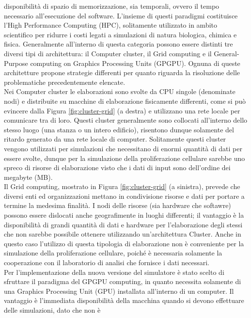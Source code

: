 disponibilità di spazio di memorizzazione, sia temporali, ovvero il tempo 
necessario all'esecuzione del software. L'insieme di questi paradigmi 
costituisce l'High Performance Computing (HPC), solitamente utilizzato in 
ambito scientifico per ridurre i costi legati a simulazioni di natura 
biologica, chimica e fisica.
Generalmente all'interno di questa categoria possono essere distinti tre 
diversi tipi di architettura: il Computer cluster, il Grid computing e 
il General-Purpose computing on Graphics Processing Units (GPGPU).
Ognuna di queste architetture propone strategie differenti per quanto riguarda 
la risoluzione delle problematiche precedentemente elencate.
\\
Nei Computer cluster le elaborazioni sono svolte da CPU singole
(denominate nodi) e distribuite su macchine di elaborazione fisicamente 
differenti, come si può evincere dalla Figura \ref{fig:cluster-grid} (a destra) 
e utilizzano una rete locale per comunicare tra di loro. Questi cluster
generalmente sono collocati all'interno dello stesso luogo
(una stanza o un intero edificio), risentono dunque solamente del ritardo generato
da una rete locale di computer. Solitamente questi cluster vengono utilizzati 
per simulazioni che necessitano di enormi quantità di dati per essere svolte, 
dunque per la simulazione della proliferazione 
cellulare sarebbe uno spreco di risorse di elaborazione visto che i 
dati di input sono dell'ordine dei megabyte (MB).
\\
Il Grid computing, mostrato in Figura \ref{fig:cluster-grid} (a sinistra),
prevede che diversi enti ed organizzazioni mettano in condivisione risorse e
dati per portare a termine la medesima finalità.
I nodi delle risorse (sia hardware che softawre) possono essere
dislocati anche geografimente in luoghi differenti;
il vantaggio è la disponibilità di grandi
quantità di dati e hardware per l'elaborazione degli stessi che non sarebbe
possibile ottenere utilizzando un'architettura Cluster. Anche in questo caso 
l'utilizzo di questa tipologia di elaborazione non è conveniente per la 
simulazione della proliferazione cellulare, poiché è necessaria 
solamente la cooperazione con il laboratorio di analisi che fornisce i 
dati necessari.
\\
Per l'implementazione della nuova versione del simulatore è stato scelto 
di sfruttare il paradigma del GPGPU computing, in quanto 
necessita solamente di una Graphics Processing Unit (GPU) installata 
all'interno di un computer. Il vantaggio è l'immediata disponibilità della 
macchina quando si devono effettuare delle simulazioni, dato che non è 
